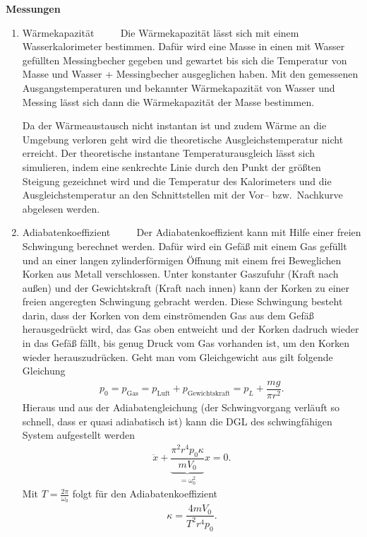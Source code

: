 \textbf{Messungen} 
\begin{enumerate}[label=--]
        \item Wärmekapazität $\qquad $ 
                Die Wärmekapazität lässt sich mit einem Wasserkalorimeter bestimmen. 
                Dafür wird eine Masse in einen mit Wasser gefüllten Messingbecher gegeben und gewartet bis sich die Temperatur von Masse und Wasser + Messingbecher ausgeglichen haben. 
                Mit den gemessenen Ausgangstemperaturen und bekannter Wärmekapazität von Wasser und Messing lässt sich dann die Wärmekapazität der Masse bestimmen.\par
                Da der Wärmeaustausch nicht instantan ist und zudem Wärme an die Umgebung verloren geht wird die theoretische Ausgleichstemperatur nicht erreicht.
                Der theoretische instantane Temperaturausgleich lässt sich simulieren, indem eine senkrechte Linie durch den Punkt der größten Steigung gezeichnet wird und die Temperatur des Kalorimeters und die Ausgleichstemperatur an den Schnittstellen mit der Vor-- bzw.\ Nachkurve abgelesen werden.
        \item Adiabatenkoeffizient $\qquad $ 
                Der Adiabatenkoeffizient kann mit Hilfe einer freien Schwingung berechnet werden.
                Dafür wird ein Gefäß mit einem Gas gefüllt und an einer langen zylinderförmigen Öffnung mit einem frei Beweglichen Korken aus Metall \glqq verschlossen\grqq{}.
                Unter konstanter Gaszufuhr (Kraft nach außen) und der Gewichtskraft (Kraft nach innen) kann der Korken zu einer freien angeregten Schwingung gebracht werden.
                Diese Schwingung besteht darin, dass der Korken von dem einströmenden Gas aus dem Gefäß herausgedrückt wird, das Gas oben entweicht und der Korken dadruch wieder in das Gefäß fällt, bis genug Druck vom Gas vorhanden ist, um den Korken wieder herauszudrücken.
                Geht man vom Gleichgewicht aus gilt folgende Gleichung
                \begin{align} 
                        p_0=p _{\text{Gas}}=p _{\text{Luft}}+p _{\text{Gewichtskraft}}=p_L+\dfrac{mg}{\pi r^2}
                .\end{align} 
                Hieraus und aus der Adiabatengleichung (der Schwingvorgang verläuft so schnell, dass er quasi adiabatisch ist) kann die DGL des schwingfähigen System aufgestellt werden
                \begin{align} 
                        \ddot{x}+\underbrace{\dfrac{\pi ^2r^4p_0\kappa }{mV_0}}_{=\omega _0^2}x=0
                .\end{align} 
                Mit $T=\tfrac{2\pi }{\omega _0}$ folgt für den Adiabatenkoeffizient
                \begin{align} 
                        \kappa =\dfrac{4mV_0}{T^2r^4p_0}
                .\end{align} 
\end{enumerate}

